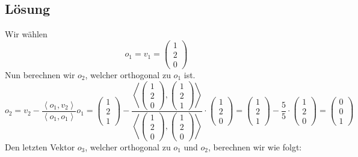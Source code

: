 \documentclass[german,12pt]{homework}
\newcommand{\dotproduct}[2]{\left\langle#1, #2\right\rangle}
\begin{document}
    \subsection*{Lösung}
    Wir wählen
    \[o_1 = v_1 = \begin{pmatrix}1\\2\\0\end{pmatrix}\]
    Nun berechnen wir \(o_2\), welcher orthogonal zu \(o_1\) ist.
    \[o_2 = v_2 - \frac{\dotproduct{o_1}{v_2}}{\dotproduct{o_1}{o_1}}o_1 = \begin{pmatrix}1\\2\\1\end{pmatrix} - \frac{\dotproduct{\begin{pmatrix}1\\2\\0\end{pmatrix}}{\begin{pmatrix}1\\2\\1\end{pmatrix}}}{\dotproduct{\begin{pmatrix}1\\2\\0\end{pmatrix}}{\begin{pmatrix}1\\2\\0\end{pmatrix}}} \cdot \begin{pmatrix}1\\2\\0\end{pmatrix} = \begin{pmatrix}1\\2\\1\end{pmatrix} - \frac{5}{5} \cdot \begin{pmatrix}1\\2\\0\end{pmatrix} = \begin{pmatrix}0\\0\\1\end{pmatrix}\]
    Den letzten Vektor \(o_3\), welcher orthogonal zu \(o_1\) und \(o_2\), berechnen wir wie folgt:
\end{document}
